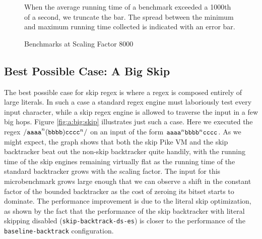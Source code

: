 \begin{figure}
\caption{Benchmarks at Scaling Factor 8000}
\label{fig:8000:all}

When the average running time of a benchmark exceeded a
1000th of a second, we truncate the bar. The spread between
the minimum and maximum running time collected is indicated
with an error bar.

\end{figure}


\subsection{Best Possible Case: A Big Skip}

The best possible case for skip regex is where a regex is composed
entirely of large literals. In such a case a standard regex engine
must laboriously test every input character, while a skip regex
engine is allowed to traverse the input in a few big hops. Figure
\ref{fig:a:big:skip} illustrates just such a case. Here we executed the
regex ${\tt /aaaa}^n{\tt (bbbb)}{\tt cccc}^n{\tt /}$ on
an input of the form ${\tt aaaa}^n{\tt bbbb}^n{\tt cccc}$.
As we might expect,
the graph shows that both the skip Pike VM and the skip backtracker
beat out the non-skip backtracker quite handily, with the running time
of the skip engines remaining virtually flat as the running
time of the standard backtracker grows with the scaling factor.
The input for this microbenchmark grows large enough that we can
observe a shift in the constant factor of the bounded backtracker
as the cost of zeroing its bitset starts to dominate.
The performance improvement is due to the literal skip
optimization, as shown by the fact that the performance of the skip
backtracker with literal skipping disabled (\verb'skip-backtrack-ds-es')
is closer to the performance of the \verb'baseline-backtrack' configuration.

